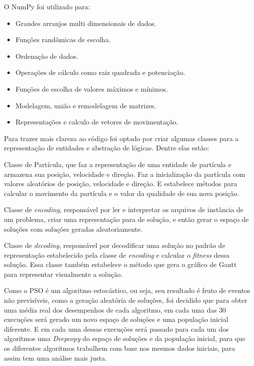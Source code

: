         \hfill\newline
        \noindent O NumPy foi utilizado para: 
        \begin{itemize}
            \item Grandes arranjos multi dimensionais de dados. 
            \item Funções randômicas de escolha.
            \item Ordenação de dados.
            \item Operações de cálculo como raiz quadrada e potenciação.
            \item Funções de escolha de valores máximos e mínimos.
            \item Modelagem, união e remodelagem de matrizes.
            \item Representações e calculo de vetores de movimentação.
        \end{itemize}
        
        \hfill\newline
        Para trazer mais clareza ao código foi optado por criar algumas classes para a representação de entidades e abstração de lógicas. Dentre elas estão:\newline
        
        Classe de Partícula, que faz a representação de uma entidade de partícula e armazena sua posição, velocidade e direção. Faz a inicialização da partícula com valores aleatórios de posição, velocidade e direção. E estabelece métodos para calcular o movimento da partícula e o valor da qualidade de sua nova posição.\newline
        
        Classe de \textit{encoding}, responsável por ler e interpretar os arquivos de instância de um problema, criar uma representação para de solução, e então gerar o espaço de soluções com soluções geradas aleatoriamente.\newline
         
        Classe de \textit{decoding}, responsável por decodificar uma solução no padrão de representação estabelecido pela classe de \textit{encoding} e calcular o \textit{fitness} dessa solução. Essa classe também estabelece o método que gera o gráfico de Gantt para representar visualmente a solução.\newline
        

        Como o PSO é um algoritmo estocástico, ou seja, seu resultado é fruto de eventos não previsíveis, como a geração aleatória de soluções, foi decidido que para obter uma média real dos desempenhos de cada algoritmo, em cada uma das 30 execuções será gerado um novo espaço de soluções e uma população inicial diferente.\newline
        E em cada uma dessas execuções será passado para cada um dos algoritmos uma \textit{Deepcopy} do espaço de soluções e da população inicial, para que os diferentes algoritmos trabalhem com base nos mesmos dados iniciais, para assim tem uma análise mais justa.\newline

